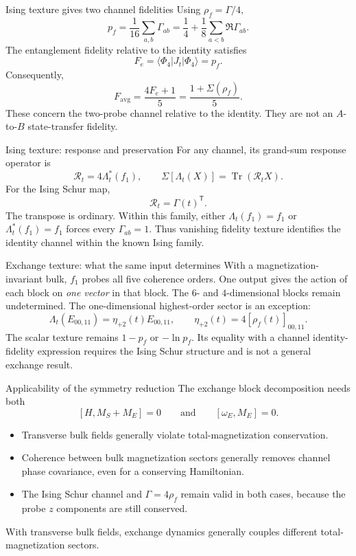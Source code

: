 \documentclass[aspectratio=169,11pt]{beamer}
\newcommand{\ket}[1]{\lvert #1\rangle}
\newcommand{\bra}[1]{\langle #1\rvert}
\newcommand{\Tr}{\operatorname{Tr}}
\begin{document}
\begin{frame}{Ising texture gives two channel fidelities}
Using $\rho_f=\Gamma/4$,
\[
p_f=\frac1{16}\sum_{a,b}\Gamma_{ab}
=\frac14+\frac18\sum_{a<b}\Re\Gamma_{ab}.
\]
The entanglement fidelity relative to the identity satisfies
\[
F_e=\bra{\Phi_4}J_t\ket{\Phi_4}=p_f.
\]
Consequently,
\[
\boxed{F_{\mathrm{avg}}=\frac{4F_e+1}{5}
=\frac{1+\Sigma(\rho_f)}5.}
\]
These concern the two-probe channel relative to the identity.
They are not an $A$-to-$B$ state-transfer fidelity.
\end{frame}

\begin{frame}{Ising texture: response and preservation}
For any channel, its grand-sum response operator is
\[
\mathcal R_t=4\Lambda_t^*(f_1),\qquad
\Sigma[\Lambda_t(X)]=\Tr(\mathcal R_tX).
\]
For the Ising Schur map,
\[
\boxed{\mathcal R_t=\Gamma(t)^{\mathsf T}.}
\]
The transpose is ordinary.
\medskip
Within this family, either $\Lambda_t(f_1)=f_1$ or
$\Lambda_t^*(f_1)=f_1$ forces every $\Gamma_{ab}=1$.
Thus vanishing fidelity texture identifies the identity channel within
the known Ising family.
\end{frame}

\begin{frame}{Exchange texture: what the same input determines}
With a magnetization-invariant bulk, $f_1$ probes all five coherence orders.
\medskip
One output gives the action of each block on \emph{one vector} in that
block. The $6$- and $4$-dimensional blocks remain undetermined.
\medskip
The one-dimensional highest-order sector is an exception:
\[
\Lambda_t(E_{00,11})=\eta_{+2}(t)E_{00,11},\qquad
\boxed{\eta_{+2}(t)=4[\rho_f(t)]_{00,11}.}
\]
The scalar texture remains $1-p_f$ or $-\ln p_f$.
Its equality with a channel identity-fidelity expression requires the
Ising Schur structure and is not a general exchange result.
\end{frame}

\begin{frame}{Applicability of the symmetry reduction}
The exchange block decomposition needs both
\[
[H,M_S+M_E]=0\qquad\text{and}\qquad[\omega_E,M_E]=0.
\]
\begin{itemize}\setlength\itemsep{9pt}
\item Transverse bulk fields generally violate total-magnetization conservation.
\item Coherence between bulk magnetization sectors generally removes channel
phase covariance, even for a conserving Hamiltonian.
\item The Ising Schur channel and $\Gamma=4\rho_f$ remain valid in both cases,
because the probe $z$ components are still conserved.
\end{itemize}
\medskip
With transverse bulk fields, exchange dynamics generally couples different
total-magnetization sectors.
\end{frame}
\end{document}
